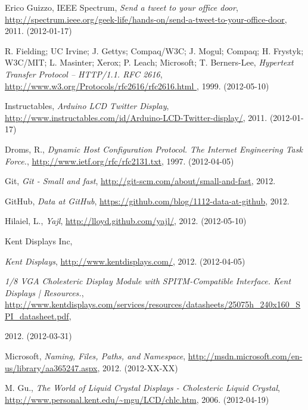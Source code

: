 \documentclass[a4paper,11pt]{article}
\newcounter{qcounter}
\begin{document}
\begin{thebibliography}{9}
\label{spectrum}
    Erico Guizzo, 
    IEEE Spectrum,
    \emph{Send a tweet to your office door},
    \url{http://spectrum.ieee.org/geek-life/hands-on/send-a-tweet-to-your-office-door},
    2011. (2012-01-17)

\label{fielding}
\label{rfc2616}
R. Fielding; UC Irvine; J. Gettys; Compaq/W3C; J. Mogul; Compaq; H. Frystyk; W3C/MIT; L. Masinter; Xerox; P. Leach; Microsoft; T. Berners-Lee,
\emph{Hypertext Transfer Protocol -- HTTP/1.1. RFC 2616},
\url{http://www.w3.org/Protocols/rfc2616/rfc2616.html },
1999. (2012-05-10)

\label{instructables}
    Instructables,
    \emph{Arduino LCD Twitter Display},
    \url{http://www.instructables.com/id/Arduino-LCD-Twitter-display/},
    2011. (2012-01-17)

\label{droms}
    Droms, R.,
    \emph{Dynamic Host Configuration Protocol. The Internet Engineering Task Force.},
    \url{http://www.ietf.org/rfc/rfc2131.txt},
    1997. (2012-04-05)

\label{git}
    Git, 
    \emph{Git - Small and fast},
    \url{http://git-scm.com/about/small-and-fast},
    2012.

\label{github}
    GitHub,
    \emph{Data at GitHub},
    \url{https://github.com/blog/1112-data-at-github},
    2012.

\label{hilaiel}
    Hilaiel, L.,
    \emph{Yajl},
    \url{http://lloyd.github.com/yajl/},
    2012. (2012-05-10)

\label{kent}
    Kent Displays Inc,
    \begin{list}{[]}{}
    \item \emph{Kent Displays},
    \url{http://www.kentdisplays.com/},
    2012. (2012-04-05) \\
    \item \emph{1/8 VGA Cholesteric Display Module with SPITM-Compatible Interface. Kent Displays | Resources.},
    \url{http://www.kentdisplays.com/services/resources/datasheets/25075h_240x160_SPI_datasheet.pdf},
    \end{list}
     2012. (2012-03-31)

\label{microsoft}
    Microsoft,
    \emph{Naming, Files, Paths, and Namespace},
    \url{http://msdn.microsoft.com/en-us/library/aa365247.aspx},
    2012. (2012-XX-XX)

\label{mingu}
    M. Gu.,
    \emph{The World of Liquid Crystal Displays - Cholesteric Liquid Crystal},
    \url{http://www.personal.kent.edu/~mgu/LCD/chlc.htm},
    2006. (2012-04-19)


\end{thebibliography}
\end{document}
